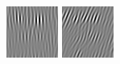 \begin{figure}[ht]
\begin{center}
  \includegraphics[width=\columnwidth/9]{ch4/figures/real_0_0.jpg}
  \includegraphics[width=\columnwidth/9]{ch4/figures/real_0_1.jpg}

\end{center}
\end{figure}
